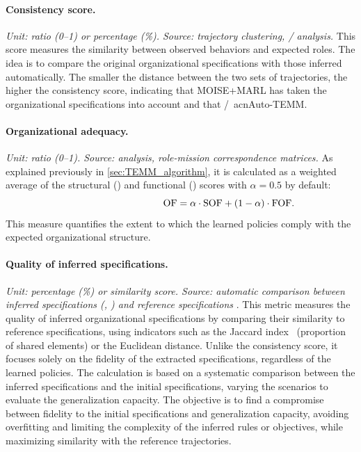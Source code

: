\paragraph{Consistency score.}
\textit{Unit: ratio (0–1) or percentage (\%). Source: trajectory clustering, / analysis.}
This score measures the similarity between observed behaviors and expected roles.
The idea is to compare the original organizational specifications with those inferred automatically.
The smaller the distance between the two sets of trajectories, the higher the consistency score, indicating that MOISE+MARL has taken the organizational specifications into account and that /\ acn{Auto-TEMM}.

\paragraph{Organizational adequacy.}
\textit{Unit: ratio (0–1). Source:  analysis, role-mission correspondence matrices.}
As explained previously in \autoref{sec:TEMM_algorithm}, it is calculated as a weighted average of the structural () and functional () scores with $\alpha = 0.5$ by default:
\[
  \hspace{3.5cm}\text{OF} = \alpha \cdot \text{SOF} + (1-\alpha) \cdot \text{FOF}.
\]
This measure quantifies the extent to which the learned policies comply with the expected organizational structure.

\paragraph{Quality of inferred specifications.}
\textit{Unit: percentage (\%) or similarity score. Source: automatic comparison between inferred specifications (, ) and reference specifications} .
This metric measures the quality of inferred organizational specifications by comparing their similarity to reference specifications, using indicators such as the Jaccard index~\cite{Jaccard1908} (proportion of shared elements) or the Euclidean distance. Unlike the consistency score, it focuses solely on the fidelity of the extracted specifications, regardless of the learned policies. The calculation is based on a systematic comparison between the inferred specifications and the initial specifications, varying the scenarios to evaluate the generalization capacity. The objective is to find a compromise between fidelity to the initial specifications and generalization capacity, avoiding overfitting and limiting the complexity of the inferred rules or objectives, while maximizing similarity with the reference trajectories.

